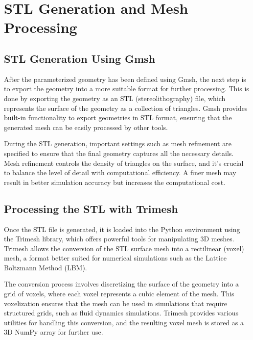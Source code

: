 \section{STL Generation and Mesh Processing}

\subsection{STL Generation Using Gmsh}

After the parameterized geometry has been defined using Gmsh, the next step is to export the geometry into a more suitable format for further processing. This is done by exporting the geometry as an STL (stereolithography) file, which represents the surface of the geometry as a collection of triangles. Gmsh provides built-in functionality to export geometries in STL format, ensuring that the generated mesh can be easily processed by other tools.

During the STL generation, important settings such as mesh refinement are specified to ensure that the final geometry captures all the necessary details. Mesh refinement controls the density of triangles on the surface, and it's crucial to balance the level of detail with computational efficiency. A finer mesh may result in better simulation accuracy but increases the computational cost.

\subsection{Processing the STL with Trimesh}

Once the STL file is generated, it is loaded into the Python environment using the Trimesh library, which offers powerful tools for manipulating 3D meshes. Trimesh allows the conversion of the STL surface mesh into a rectilinear (voxel) mesh, a format better suited for numerical simulations such as the Lattice Boltzmann Method (LBM).

The conversion process involves discretizing the surface of the geometry into a grid of voxels, where each voxel represents a cubic element of the mesh. This voxelization ensures that the mesh can be used in simulations that require structured grids, such as fluid dynamics simulations. Trimesh provides various utilities for handling this conversion, and the resulting voxel mesh is stored as a 3D NumPy array for further use.


